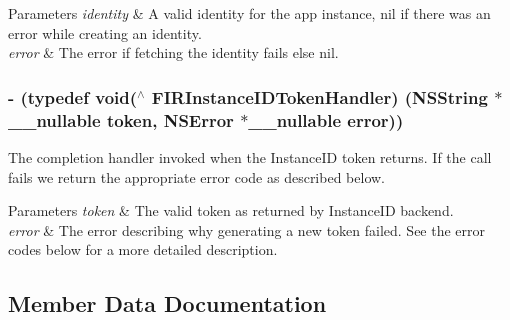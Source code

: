 \begin{DoxyParams}{Parameters}
{\em identity} & A valid identity for the app instance, nil if there was an error while creating an identity. \\
\hline
{\em error} & The error if fetching the identity fails else nil. \\
\hline
\end{DoxyParams}
\hypertarget{interface_f_i_r_instance_i_d_a47838dd5b1538db6035b93ce8be1a63a}{}
\subsubsection[{F\+I\+R\+Instance\+I\+D\+Token\+Handler}]{\setlength{\rightskip}{0pt plus 5cm}-\/ (typedef void($^\wedge$ F\+I\+R\+Instance\+I\+D\+Token\+Handler) (N\+S\+String $\ast$\+\_\+\+\_\+nullable {\bf token}, N\+S\+Error $\ast$\+\_\+\+\_\+nullable error))\hspace{0.3cm}{\ttfamily [related]}}\label{interface_f_i_r_instance_i_d_a47838dd5b1538db6035b93ce8be1a63a}
The completion handler invoked when the Instance\+I\+D token returns. If the call fails we return the appropriate {\ttfamily error code} as described below.


\begin{DoxyParams}{Parameters}
{\em token} & The valid token as returned by Instance\+I\+D backend.\\
\hline
{\em error} & The error describing why generating a new token failed. See the error codes below for a more detailed description. \\
\hline
\end{DoxyParams}


\subsection{Member Data Documentation}
\hypertarget{interface_f_i_r_instance_i_d_a458ffe70dc5bb35b35a38696893840fd}{}
